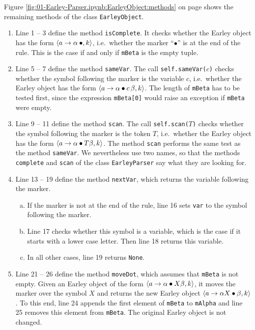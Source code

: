 \noindent
Figure \ref{fig:01-Earley-Parser.ipynb:EarleyObject:methods} on page
\pageref{fig:01-Earley-Parser.ipynb:EarleyObject:methods} shows the remaining methods of the class
\texttt{EarleyObject}.
\begin{enumerate}
\item Line 1 -- 3 define the method \texttt{isComplete}.  It checks whether the Earley object has the form
      $\pair(a \rightarrow \alpha \mdot, k)$, i.e.~whether the marker ``$\bullet$'' is at the end of the rule.
      This is the case if and only if \texttt{mBeta} is the empty tuple.
\item Line 5 -- 7 define the method \texttt{sameVar}.  The call \texttt{self.sameVar($c$)} checks whether the
      symbol following the marker is the variable $c$, i.e.~whether the Earley object has the form
      $\pair(a \rightarrow \alpha \mdot c\, \beta, k)$.
      The length of \texttt{mBeta} has to be tested first, since the expression \texttt{mBeta[0]} would raise an
      exception if \texttt{mBeta} were empty.
\item Line 9 -- 11 define the method \texttt{scan}.  The call \texttt{self.scan($T$)} checks whether the symbol
      following the marker is the token $T$, i.e.~whether the Earley object has the form
      $\pair(a \rightarrow \alpha \mdot T \beta, k)$.
      The method \texttt{scan} performs the same test as the method \texttt{sameVar}.  We nevertheless use two
      names, so that the methods \texttt{complete} and \texttt{scan} of the class \texttt{EarleyParser} say what
      they are looking for.
\item Line 13 -- 19 define the method \texttt{nextVar}, which returns the variable following the marker.
      \begin{enumerate}[(a)]
      \item If the marker is not at the end of the rule, line 16 sets \texttt{var} to the symbol following the
            marker.
      \item Line 17 checks whether this symbol is a variable, which is the case if it starts with a lower case
            letter.  Then line 18 returns this variable.
      \item In all other cases, line 19 returns \texttt{None}.
      \end{enumerate}
\item Line 21 -- 26 define the method \texttt{moveDot}, which assumes that \texttt{mBeta} is not empty.
      Given an Earley object of the form $\pair(a \rightarrow \alpha \mdot X \beta, k)$, it moves the marker over
      the symbol $X$ and returns the new Earley object $\pair(a \rightarrow \alpha X \mdot \beta, k)$.
      To this end, line 24 appends the first element of \texttt{mBeta} to \texttt{mAlpha} and line 25
      removes this element from \texttt{mBeta}.  The original Earley object is not changed.
\end{enumerate}

